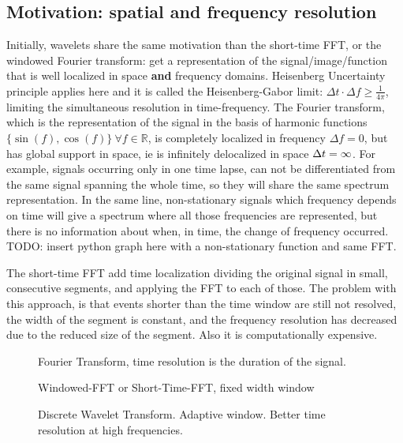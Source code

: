 \documentclass{InsightArticle}
\theoremstyle{definition}
\begin{document}
\subsection{Motivation: spatial and frequency resolution}
\label{sub:Motivation}
Initially, wavelets share the same motivation than the short-time FFT, or the windowed Fourier transform: get a representation of the signal/image/function that is well localized in space \textbf{and} frequency domains. Heisenberg Uncertainty principle applies here and it is called the Heisenberg-Gabor limit: $\Delta t \cdot \Delta f \geq \frac{1}{4\pi}$, limiting the simultaneous resolution in time-frequency.
The Fourier transform, which is the representation of the signal in the basis of harmonic functions $\{\sin(f),\cos(f)\}\ \forall f \in \mathbb{R}$, is completely localized in frequency $\Delta f = 0$, but has global support in space, ie is infinitely delocalized in space $\Delta t = \infty$. For example, signals occurring only in one time lapse, can not be differentiated from the same signal spanning the whole time, so they will share the same spectrum representation. In the same line, non-stationary signals which frequency depends on time will give a spectrum where all those frequencies are represented, but there is no information about when, in time, the change of frequency occurred.  TODO: insert python graph here with a non-stationary function and same FFT.

The short-time FFT add time localization dividing the original signal in small, consecutive segments, and applying the FFT to each of those. The problem with this approach, is that events shorter than the time window are still not resolved, the width of the segment is constant, and the frequency resolution has decreased due to the reduced size of the segment. Also it is computationally expensive.\\
\begin{figure}[!htb]
  \centering
    \begin{minipage}[t]{.33\textwidth}
        \centering
        
        \captionsetup{width=0.8\textwidth}
        \caption{Fourier Transform, time resolution is the duration of the signal.}
        \label{fig:grid_fft}
    \end{minipage}%
    \begin{minipage}[t]{.33\textwidth}
        \centering
        
        \captionsetup{width=0.8\textwidth}
        \caption{Windowed-FFT or Short-Time-FFT, fixed width window}
        \label{fig:grid_windowed}
    \end{minipage}
    \begin{minipage}[t]{.33\textwidth}
        \centering
        
        \captionsetup{width=0.8\textwidth}
        \caption{Discrete Wavelet Transform. Adaptive window. Better time resolution at high frequencies.}
        \label{fig:grid_wavelet}
    \end{minipage}
\end{figure}
\end{document}
